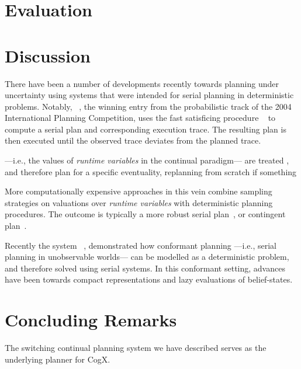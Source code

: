 \documentclass[letterpaper]{article}
\begin{document}
\section{Evaluation}


\section{Discussion}

There have been a number of developments recently towards planning
under uncertainty using systems that were intended for serial planning
in deterministic problems.  Notably,
~\cite{yoon:etal:2007}, the winning entry from the
probabilistic track of the 2004 International Planning Competition,
uses the fast satisficing procedure
~\cite{hoffmann:nebel:2001} to compute a serial plan and
corresponding execution trace. The resulting plan is then executed
until the observed trace deviates from the planned trace.

 ---i.e., the values of {\em
runtime variables} in the continual paradigm--- are treated , and
therefore plan for a specific eventuality, replanning from scratch if
something


More computationally expensive approaches in this vein combine
sampling strategies on valuations over {\em runtime variables} with
deterministic planning procedures. The outcome is typically a more
robust serial plan~\cite{yoon:etal:2008}, or contingent
plan~\cite{majercik:2006}.



Recently the system
~\cite{hoffmann:brafman:2006}, demonstrated how
conformant planning ---i.e., serial planning in unobservable worlds---
can be modelled as a deterministic problem, and therefore solved using
serial systems. In this conformant setting, advances have been towards
compact representations and lazy evaluations of belief-states.
 

\section{Concluding Remarks}

The switching continual planning system we have described serves as
the underlying planner for CogX. 




\end{document}
